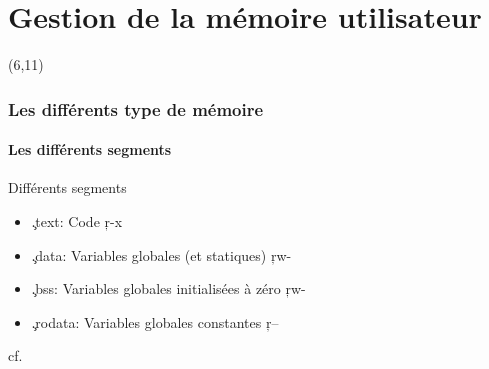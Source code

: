 %
%
%

\part{Gestion de la mémoire utilisateur}

{
\begin{frame}[plain]
  \partpage
  \begin{textblock}{10}(6,11)
    \begin{quote}
      \rmfamily\textit\textbf\color{darkgray}{\large
        ``Knock, knock.\\
        -- Who’s there?\\
        ... very long pause...\\
        -- Java.}
    \end{quote}
  \end{textblock}
\end{frame}
}

\begin{frame}
  \tableofcontents
\end{frame}

\section{Les différents type de mémoire}

\subsection{Les différents segments}

\begin{frame}[fragile=singleslide]{Différents segments}
  \begin{itemize}
  \item \c{.text}: Code \c{r-x}
  \item \c{.data}: Variables globales (et statiques) \c{rw-}
  \item \c{.bss}: Variables globales initialisées à zéro \c{rw-}
  \item \c{.rodata}: Variables globales constantes \c{r--}
  \end{itemize}
  cf. 
\end{frame}


